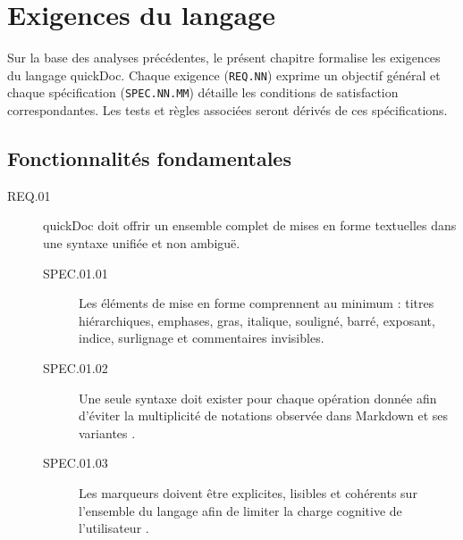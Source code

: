 \documentclass[a4paper,12pt]{article}
\begin{document}
\section{Exigences du langage}
\label{sec:orgd1f94b3}
Sur la base des analyses précédentes, le présent chapitre formalise les exigences du langage quickDoc.
Chaque exigence (\texttt{REQ.NN}) exprime un objectif général et chaque spécification (\texttt{SPEC.NN.MM}) détaille les conditions de satisfaction correspondantes.
Les tests et règles associées seront dérivés de ces spécifications.
\subsection{Fonctionnalités fondamentales}
\label{sec:org3d203ed}
\begin{description}
\item[{\label{org51a2bf3}REQ.01}] quickDoc doit offrir un ensemble complet de mises en forme textuelles dans une syntaxe unifiée et non ambiguë.
\begin{description}
\item[{\label{org5f354a0}SPEC.01.01}] Les éléments de mise en forme comprennent au minimum : titres hiérarchiques, emphases, gras, italique, souligné, barré, exposant, indice, surlignage et commentaires invisibles.
\item[{\label{org893ee5a}SPEC.01.02}] Une seule syntaxe doit exister pour chaque opération donnée afin d’éviter la multiplicité de notations observée dans Markdown et ses variantes \autocite{johnmacfarlaneCommonMarkSpec2024,GitHubFlavoredMarkdown2019,MarkdownVariants2023}.
\item[{\label{org141a438}SPEC.01.03}] Les marqueurs doivent être explicites, lisibles et cohérents sur l’ensemble du langage afin de limiter la charge cognitive de l’utilisateur \autocite{allenAsciiDocSyntaxQuick,ducasseMicrodownCleanExtensible2020}.
\end{description}


\end{description}
\end{document}
